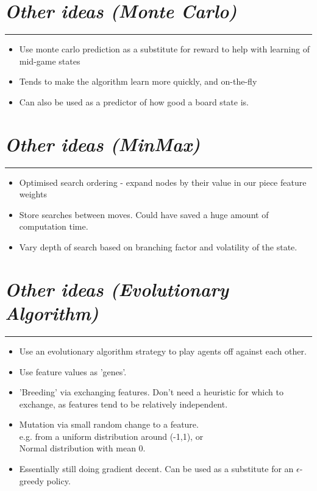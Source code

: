 \documentclass[10pt]{report}
\begin{document}
\begin{multicols}{2}
\section*{\emph{Other ideas (Monte Carlo)}}
\hrule
    \begin{itemize}
  \item
    	Use monte carlo prediction as a substitute for reward to help with learning of mid-game states
  \item
	Tends to make the algorithm learn more quickly, and on-the-fly
  \item
	Can also be used as a predictor of how good a board state is.
  \end{itemize}

\section*{\emph{Other ideas (MinMax)}}
\hrule
    \begin{itemize}
  \item
    Optimised search ordering - expand nodes by their value in our piece feature weights
  \item
	Store searches between moves. Could have saved a huge amount of computation time.
  \item
	Vary depth of search based on branching factor and volatility of the state.
  \end{itemize}

\section*{\emph{Other ideas (Evolutionary Algorithm)}}
\hrule
    \begin{itemize}
  \item
   	Use an evolutionary algorithm strategy to play agents off against each other.
  \item
	Use feature values as 'genes'.
  \item
	'Breeding' via exchanging features. Don't need a heuristic for which to exchange, as features tend to be relatively independent.
  \item
	Mutation via small random change to a feature.
	\\ e.g. from a uniform distribution around (-1,1), or
	\\ Normal distribution with mean 0.
  \item
	Essentially still doing gradient decent. Can be used as a substitute for an $\epsilon$-greedy policy.
  \end{itemize}


\end{multicols}
\end{document}
